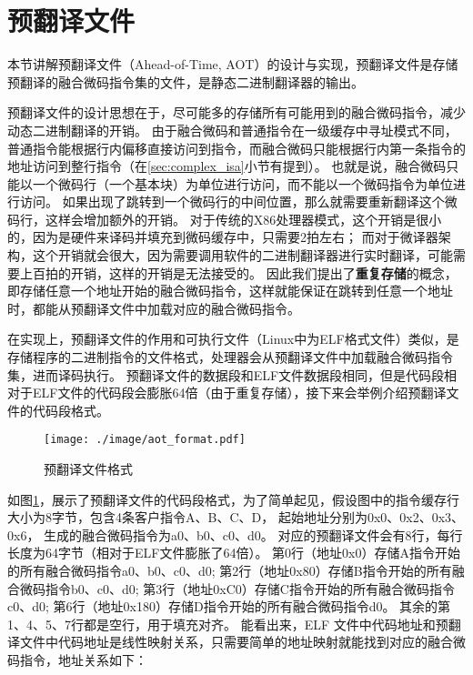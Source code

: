 \section{预翻译文件}

本节讲解预翻译文件（Ahead-of-Time, AOT）的设计与实现，预翻译文件是存储预翻译的融合微码指令集的文件，是静态二进制翻译器的输出。

预翻译文件的设计思想在于，尽可能多的存储所有可能用到的融合微码指令，减少动态二进制翻译的开销。
由于融合微码和普通指令在一级缓存中寻址模式不同，普通指令能根据行内偏移直接访问到指令，而融合微码只能根据行内第一条指令的地址访问到整行指令（在\ref{sec:complex_isa}小节有提到）。
也就是说，融合微码只能以一个微码行（一个基本块）为单位进行访问，而不能以一个微码指令为单位进行访问。
如果出现了跳转到一个微码行的中间位置，那么就需要重新翻译这个微码行，这样会增加额外的开销。
对于传统的X86处理器模式，这个开销是很小的，因为是硬件来译码并填充到微码缓存中，只需要2拍左右；
而对于微译器架构，这个开销就会很大，因为需要调用软件的二进制翻译器进行实时翻译，可能需要上百拍的开销，这样的开销是无法接受的。
因此我们提出了\textbf{重复存储}的概念，即存储任意一个地址开始的融合微码指令，这样就能保证在跳转到任意一个地址时，都能从预翻译文件中加载对应的融合微码指令。

在实现上，预翻译文件的作用和可执行文件（Linux中为ELF格式文件）类似，是存储程序的二进制指令的文件格式，处理器会从预翻译文件中加载融合微码指令集，进而译码执行。
预翻译文件的数据段和ELF文件数据段相同，但是代码段相对于ELF文件的代码段会膨胀64倍（由于重复存储），接下来会举例介绍预翻译文件的代码段格式。

\begin{figure}[!htbp]
  \centering
  \texttt{[image: ./image/aot\_format.pdf]}
  \caption{预翻译文件格式}
  \label{img:aot_format}
\end{figure}

如图\ref{img:aot_format}，展示了预翻译文件的代码段格式，为了简单起见，假设图中的指令缓存行大小为8字节，包含4条客户指令A、B、C、D，
起始地址分别为0x0、0x2、0x3、0x6，
生成的融合微码指令为a0、b0、c0、d0。
对应的预翻译文件会有8行，每行长度为64字节（相对于ELF文件膨胀了64倍）。
第0行（地址0x0）存储A指令开始的所有融合微码指令a0、b0、c0、d0;
第2行（地址0x80）存储B指令开始的所有融合微码指令b0、c0、d0;
第3行（地址0xC0）存储C指令开始的所有融合微码指令c0、d0;
第6行（地址0x180）存储D指令开始的所有融合微码指令d0。
其余的第1、4、5、7行都是空行，用于填充对齐。
能看出来，ELF 文件中代码地址和预翻译文件中代码地址是线性映射关系，只需要简单的地址映射就能找到对应的融合微码指令，地址关系如下：

